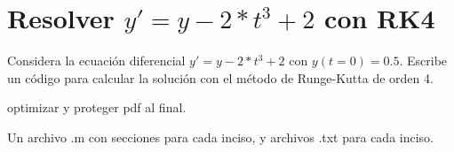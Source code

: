 \documentclass{article}
\begin{document}
\section{Resolver \texorpdfstring{$y'=y- 2*t^3 + 2$}{y'=y  2*t ...} con RK4}
Considera la ecuación diferencial $y' = y- 2*t^3 + 2$ con $y(t=0) = 0.5$. Escribe un código para
calcular la solución con el método de Runge-Kutta de orden 4.

optimizar y proteger pdf al final.

Un archivo .m con secciones %
para cada inciso,
y archivos .txt para cada inciso.
\end{document}
